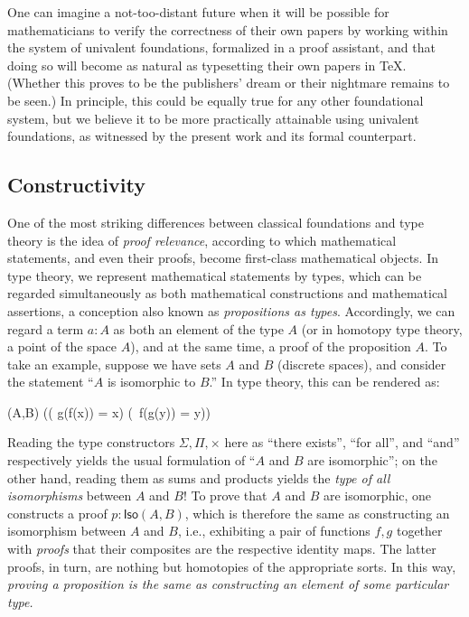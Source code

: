 One can imagine a not-too-distant future when it will be possible for mathematicians to verify the correctness of their own papers by working within the system of univalent foundations, formalized in a proof assistant, and that doing so will become as natural as typesetting their own papers in \TeX.
(Whether this proves to be the publishers' dream or their nightmare remains to be seen.) 
In principle, this could be equally true for any other foundational system, but we believe it to be more practically attainable using univalent foundations, as witnessed by the present work and its formal counterpart.

\subsection*{Constructivity} 


One of the most striking differences between classical foundations and type theory is the idea of \emph{proof relevance}, according to which mathematical statements, and even their proofs, become first-class mathematical objects.
In type theory, we represent mathematical statements by types, which can be regarded simultaneously as both mathematical constructions and mathematical assertions, a conception also known as \emph{propositions as types}.
%
Accordingly, we can regard a term $a : A$ as both an element of the type $A$ (or in homotopy type theory, a point of the space $A$), and at the same time, a proof of the proposition $A$.
To take an example, suppose we have sets $A$ and $B$ (discrete spaces), and consider the statement ``$A$ is isomorphic to $B$.''
In type theory, this can be rendered as:
\begin{narrowmultline*}
  (A,B)  \narrowbreak
  \Big(\big( g(f(x)) = x\big) \times \big(\, f(g(y)) = y\big)\Big)
\end{narrowmultline*}
%
Reading the type constructors $\Sigma, \Pi, \times$  here  as ``there exists'', ``for all'', and ``and'' respectively yields the usual formulation of ``$A$ and $B$ are isomorphic''; on the other hand, reading them as sums and products yields the \emph{type of all isomorphisms} between $A$ and $B$!  To prove that $A$ and $B$ are isomorphic, one  constructs a proof $p : \mathsf{Iso}(A,B)$, which is therefore the same  as constructing an isomorphism between $A$ and $B$, i.e., exhibiting a pair of functions $f, g$ together with \emph{proofs} that their composites are the respective identity maps.  The latter proofs, in turn, are nothing but homotopies of the appropriate sorts.  In this way, \emph{proving a proposition is the same as constructing an element of some particular type.}

